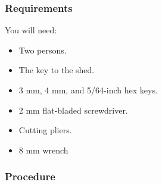 \subsubsection{Requirements}

You will need:

\begin{itemize}
    \item Two persons.
    \item The key to the shed.
    \item 3 mm, 4 mm, and 5/64-inch hex keys.
    \item 2 mm flat-bladed screwdriver.
    \item Cutting pliers.
    \item 8 mm wrench
\end{itemize}

\subsubsection{Procedure}


